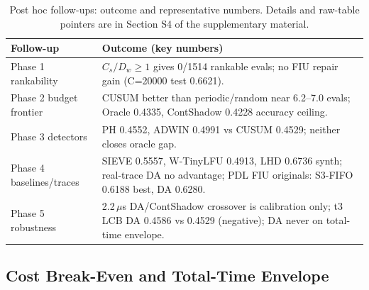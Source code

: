 \documentclass[10pt,twocolumn,a4paper]{IEEEtran}
\begin{document}
\begin{table}[!t]
\caption{Post hoc follow-ups: outcome and representative numbers. Details
and raw-table pointers are in Section S4 of the supplementary material.}
\label{tab:prespec}
\footnotesize
\setlength{\tabcolsep}{3pt}
\begin{tabular}{@{}p{}p{}@{}}
\toprule
Follow-up & Outcome (key numbers) \\
\midrule
Phase 1 rankability & $C_s/D_w\ge1$ gives 0/1514 rankable evals; no FIU repair gain (C=20000 test 0.6621). \\
Phase 2 budget frontier & CUSUM better than periodic/random near 6.2--7.0 evals; Oracle 0.4335, ContShadow 0.4228 accuracy ceiling. \\
Phase 3 detectors & PH 0.4552, ADWIN 0.4991 vs CUSUM 0.4529; neither closes oracle gap. \\
Phase 4 baselines/traces & SIEVE 0.5557, W-TinyLFU 0.4913, LHD 0.6736 synth; real-trace DA no advantage; PDL FIU originals: S3-FIFO 0.6188 best, DA 0.6280. \\
Phase 5 robustness & 2.2\,$\mu$s DA/ContShadow crossover is calibration only; t3 LCB DA 0.4586 vs 0.4529 (negative); DA never on total-time envelope. \\
\bottomrule
\end{tabular}
\end{table}

\subsection{Cost Break-Even and Total-Time Envelope}
\label{sec:breakeven}
\end{document}
